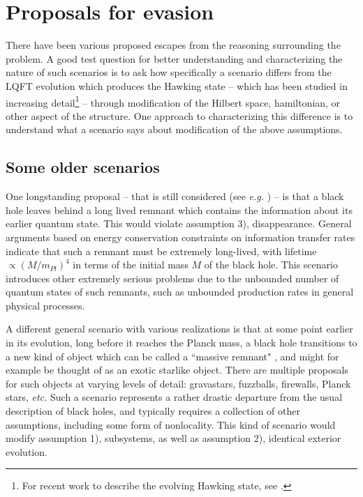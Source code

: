 \documentclass[12pt]{article}
\numberwithin{equation}{section}
\begin{document}
\section{Proposals for evasion}


There have been various proposed escapes from the reasoning surrounding the problem.  A good test question for better understanding and characterizing the nature of such scenarios is to ask how specifically a scenario differs from the LQFT evolution which produces the Hawking state --  which has been studied in increasing detail\footnote{For recent work to describe the evolving Hawking state, see \cite{SGsch,SG2d,GiPe}.} -- through modification of the Hilbert space, hamiltonian, or other aspect of the structure.  One approach to characterizing this difference is to understand what a scenario says about modification of the above assumptions.


\subsection{Some older scenarios}

One longstanding proposal -- that is still considered (see {\it e.g.} \cite{Bianchi:2018mml}) -- is that a black hole leaves behind a long lived remnant which contains the information about its earlier quantum state.  This would violate assumption 3), disappearance.  General arguments based on energy conservation constraints on information transfer rates\cite{CaWi,Pres} indicate that such a remnant must be extremely long-lived, with lifetime $\propto (M/m_{Pl})^4$ in terms of the initial mass $M$ of the black hole.   This scenario introduces other extremely serious problems\cite{WABHIP,Susstrouble} due to the unbounded number of quantum states of such remnants, such as unbounded production rates in general physical processes.

A different general scenario with various realizations is that at some point earlier in its evolution, long before it reaches the Planck mass, a black hole transitions to a new kind of object which can be called a ``massive remnant" \cite{BHMR}, and might for example be thought of as an exotic starlike object.  There are multiple proposals for such objects at varying levels of detail:  gravastars\cite{MaMo}, fuzzballs\cite{fuzzrev}, firewalls\cite{AMPS}, Planck stars\cite{RoVi}, {\it etc.}  Such a scenario represents a rather drastic departure from the usual description of black holes, and typically requires a collection of other assumptions, including some form of nonlocality.
This kind of scenario would modify assumption 1), subsystems, as well as assumption 2), identical exterior evolution.
\end{document}
